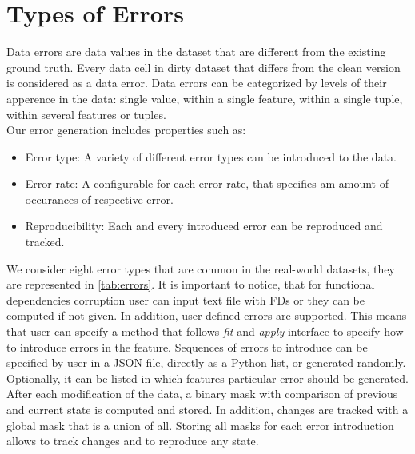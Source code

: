 \section{Types of Errors}


Data errors are data values in the dataset that are different from the existing ground truth. 
Every data cell in dirty dataset that differs from the clean version is considered as a data error. 
Data errors can be categorized by levels of their apperence in the data: single value, within a single feature, within a single tuple, within several features or tuples.
\\
Our error generation includes properties such as:
\begin{itemize}
    \item Error type: A variety of different error types can be introduced to the data.
    \item Error rate: A configurable for each error rate, that specifies am amount of occurances of respective error.
    \item Reproducibility: Each and every introduced error can be reproduced and tracked.
\end{itemize}

We consider eight error types that are common in the real-world datasets, they are represented in \ref{tab:errors}. 
It is important to notice, that for functional dependencies corruption user can input text file with FDs or they can be computed if not given.
In addition, user defined errors are supported. 
This means that user can specify a method that follows \emph{fit} and \emph{apply} interface to specify how to introduce errors in the feature. 
Sequences of errors to introduce can be specified by user in a JSON file, directly as a Python list, or generated randomly.
Optionally, it can be listed in which features particular error should be generated.\\
After each modification of the data, a binary mask with comparison of previous and current state is computed and stored. 
In addition, changes are tracked with a global mask that is a union of all. Storing all masks for each error introduction allows to track changes and to reproduce any state.

